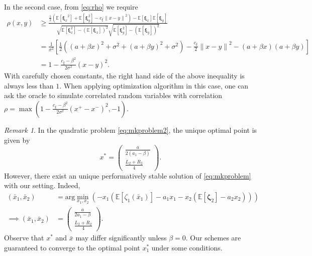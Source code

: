 \documentclass[11pt,reqno]{amsart}
\newcommand{\1}{{\bf 1}}
\newcommand{\2}{{\bf 2}}
\newcommand{\pc}[1]{{\color{cyan}#1}}
\newcommand{\us}[1]{\textcolor{red}{#1}}
\newcommand{\bxi}{\boldsymbol{\xi}}
\newcommand{\bzeta}{\boldsymbol{\zeta}}
\numberwithin{equation}{section}
\theoremstyle{remark}
\newtheorem{remark}{Remark}[section]
\begin{document}
{			 In the second case, from \eqref{eq:rho} we require 
			\begin{align*}
				\rho({x,y}) &\geq \frac{\frac{1}{2}\left(\mathbb{E}[{\bxi_x}^2]+\mathbb{E}[{\bxi_y^2}]-c_\xi{\|x-y\|}^2\right)-\mathbb{E}[\bxi_x]\mathbb{E}[\bxi_y]}{\sqrt{\mathbb{E}[\bxi_x^2]-\left(\mathbb{E}[\bxi_x]\right)^2}\sqrt{\mathbb{E}[\bxi_y^2]-\left(\mathbb{E}[\bxi_y]\right)^2}}\\
				&= \frac{1}{\sigma^2}\left[\frac{1}{2} \left((a+{\beta} x)^2+\sigma^2+(a+{\beta} y)^2+\sigma^2\right)-\frac{c_\xi}{2}{\|x-y\|}^2-(a+{\beta} x)(a+{\beta} y)\right]\\
				&=1-\frac{c_\xi-{\beta}^2}{2\sigma^2}(x-y)^2.
			\end{align*}
			With carefully chosen constants, the right hand side of the above inequality is always less than $1$. When applying optimization algorithm in this case, one can ask the oracle to simulate correlated random variables with correlation $\rho=\max(1-\frac{c_\xi-{\beta}^2}{2\sigma^2}(x^+-x^-)^2,-1)$. 
			
			
			\begin{remark}
				In the {quadratic} problem \eqref{eq:mkproblem2},  the unique optimal point is given by  
				$$x^*={\begin{pmatrix} \tfrac{a}{2(a_1-{\beta})} \\ \tfrac{L_2+R_2}{4} \end{pmatrix}}.$$ 
				However, there exist an unique performatively stable solution  of \eqref{eq:mkproblem} with our setting. Indeed,
				\begin{align*}%
					(\bar{x}_1,\bar{x}_2) &= \text{arg} \min_{x_1,x_2} \left(-x_1\left(\mathbb{E}\left[\zeta_1\left(\bar{x}_1\right)\right]-a_1 x_1-x_2\left(\mathbb{E}\left[\bzeta_2\right]-a_2 x_2\right)\right) \right)\\
					\implies 	(\bar{x}_1,\bar{x}_2)	& = \begin{pmatrix}
						\tfrac{a}{2a_1-{\beta}} \\ \tfrac{L_2+R_2}{4}
					\end{pmatrix}.
				\end{align*}
				Observe that $x^*$ and $\bar{x}$ may differ significantly unless $\beta = 0$. Our schemes are guaranteed to converge to the optimal point $x^*_1$ under some conditions. 
			\end{remark}
}
\end{document}
